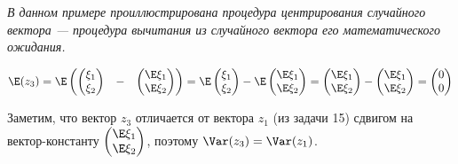 \documentclass[pdftex,11pt,openany]{book}\usepackage[]{graphicx}\usepackage[]{color}
\begin{document}
\begin{solution}
\textit{В данном примере проиллюстрирована процедура центрирования случайного вектора --- процедура вычитания из случайного вектора его математического ожидания.}

$\E (z_3) = \E   \begin{pmatrix}
 \begin{pmatrix}
\xi_1 \\
\xi_2 \\
\end{pmatrix}  & - &  \begin{pmatrix}
\E  \xi_1 \\
\E  \xi_2 \\
\end{pmatrix}  \\
\end{pmatrix}  = \E   \begin{pmatrix}
\xi_1 \\
\xi_2 \\
\end{pmatrix}  - \E   \begin{pmatrix}
\E  \xi_1 \\
\E  \xi_2 \\
\end{pmatrix}  =  \begin{pmatrix}
\E  \xi_1 \\
\E  \xi_2 \\
\end{pmatrix}  -  \begin{pmatrix}
\E  \xi_1 \\
\E  \xi_2 \\
\end{pmatrix}  =  \begin{pmatrix}
0\\
0\\
\end{pmatrix} $

Заметим, что вектор $z_3$ отличается от вектора $z_1$ (из задачи 15) сдвигом на вектор-константу $ \begin{pmatrix}
\E  \xi_1 \\
\E  \xi_2 \\
\end{pmatrix} $, поэтому $\Var (z_3) = \Var (z_1)$.
\end{solution}
\end{document}
